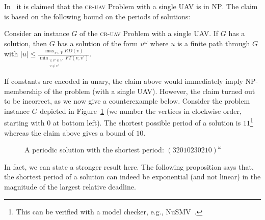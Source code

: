 \documentclass[envcountsame]{llncs}
\begin{document}
In~\cite{Basilico2012} it is claimed that the \textsc{cr-uav} Problem with a
single UAV is in $\mathrm{NP}$. The claim is based on the following bound on the periods
of solutions:

\begin{claim}\label{falseclaim}
Consider an instance $G$ of the \textsc{cr-uav} Problem with a single UAV.
If $G$ has a solution, then $G$ has a solution of the form $u^\omega$ 
where $u$ is a finite path through $G$ with 
$|u| \leq \displaystyle{ \frac{\max_{v \in V} \mathit{RD}(v)}{\min_{\substack{v, v' \in V \\ v \neq v'}} \mathit{FT}(v, v')} }$.
\end{claim} 

If constants are encoded in unary, the claim above would immediately imply
$\mathrm{NP}$-membership of the problem (with a single UAV).
However, the claim turned out to be incorrect, as we now give a counterexample below.
Consider the problem instance $G$ depicted in Figure~\ref{fig:cex} (we number the vertices
in clockwise order, starting with $0$ at bottom left).
The shortest possible period of a solution is $11$\footnote{This can be verified with a model checker, e.g., NuSMV~\cite{Cimatti2002}.}
whereas the claim above gives a bound of $10$.

\begin{figure}[h]
\centering
{}
\caption{A periodic solution with the shortest period: $(32010230210)^\omega$}
\label{fig:cex}
\end{figure}

In fact, we can state a stronger result here.
The following proposition says that, the shortest period of a solution can indeed be exponential (and not linear)
in the magnitude of the largest relative deadline.
\end{document}
